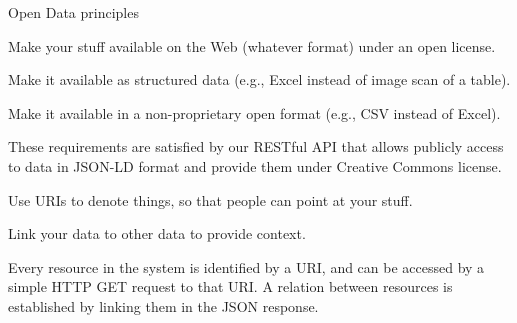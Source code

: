 \begin{frame}[allowframebreaks]{Open Data principles\autocite{FiveStarLinkedData}}
	\begin{block}{\faStar\faStarO\faStarO\faStarO\faStarO}
		Make your stuff available on the Web (whatever format) under an open
		license.
	\end{block}
	\vspace*{-8pt}
	\begin{block}{\faStar\faStar\faStarO\faStarO\faStarO}
		Make it available as structured data (e.g., Excel instead of image scan
		of a table).
	\end{block}
	\vspace*{-8pt}
	\begin{block}{\faStar\faStar\faStar\faStarO\faStarO}
		Make it available in a non-proprietary open format (e.g., CSV instead of
		Excel).
	\end{block}
	These requirements are satisfied by our RESTful API that allows
	publicly access to data in JSON-LD format and provide them under Creative
	Commons license.

	\framebreak

	\begin{block}{\faStar\faStar\faStar\faStar\faStarO}
		Use URIs to denote things, so that people can point at your stuff.
	\end{block}
	\vspace*{-8pt}
	\begin{block}{\faStar\faStar\faStar\faStar\faStar}
		Link your data to other data to provide context.
	\end{block}
	Every resource in the system is identified by a URI, and can be accessed
	by a simple HTTP GET request to that URI. A relation between resources
	is established by linking them in the JSON response.
\end{frame}

